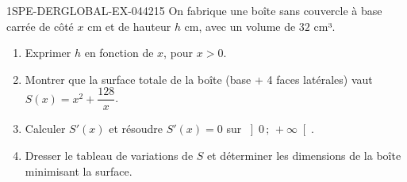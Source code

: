 \begin{exercice}{1SPE-DERGLOBAL-EX-044}{2}{15}
On fabrique une boîte sans couvercle à base carrée de côté $x$ cm et de hauteur $h$ cm,
avec un volume de $32$ cm³.

\begin{enumerate}
  \item Exprimer $h$ en fonction de $x$, pour $x > 0$.
  \item Montrer que la surface totale de la boîte (base + 4 faces latérales) vaut
        $S(x) = x^2 + \dfrac{128}{x}$.
  \item Calculer $S'(x)$ et résoudre $S'(x) = 0$ sur $\left]0\,;\,+\infty\right[$.
  \item Dresser le tableau de variations de $S$ et déterminer les dimensions de la boîte
        minimisant la surface.
\end{enumerate}
\end{exercice}
